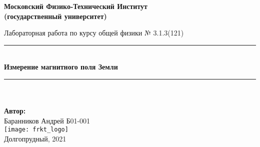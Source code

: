 \newcommand{\HRule}{\rule{\linewidth}{0.7mm}} %
	
	\begin{center}
		\large\textbf{Московский Физико-Технический Институт}\\
		\large\textbf{(государственный университет)}
	
		\vfill
		
		\Large Лабораторная работа по курсу общей физики № 3.1.3(121)\\[0.5cm] %
		
		
		\HRule
		\\[0.4cm]
		{ \huge \bfseries Измерение магнитного поля Земли}
		\\[0.4cm] %
		\HRule
		\\[0.5cm]
		
		\ \\
	\textbf{\large Автор:} \\	
	\large Баранников Андрей Б01-001\\
		\vfill
		\hspace*{-0.8 cm}\texttt{[image: frkt\_logo]}\\
		\large Долгопрудный, 2021
	\end{center}

\newpage
\setcounter{page}{2}
\fancyfoot[c]{\thepage}
\fancyhead[R]{}
